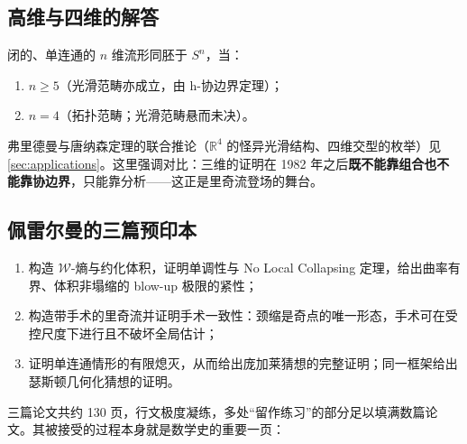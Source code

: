 \subsection{高维与四维的解答}

\begin{theorem}\label{thm:higherdim}
    闭的、单连通的 $n$ 维流形同胚于 $S^n$，当：
    \begin{enumerate}[label=(\arabic*)]
        \item $n \geq 5$（光滑范畴亦成立，由 h-协边界定理）；
        \item $n = 4$（拓扑范畴；光滑范畴悬而未决）。
    \end{enumerate}
\end{theorem}

弗里德曼与唐纳森定理的联合推论（$\mathbb{R}^4$ 的怪异光滑结构、四维交型的枚举）见\cref{sec:applications}。这里强调对比：三维的证明在 1982 年之后\textbf{既不能靠组合也不能靠协边界}，只能靠分析——这正是里奇流登场的舞台。

\subsection{佩雷尔曼的三篇预印本}

\begin{theorem}[佩雷尔曼，2002--2003]\label{thm:perelman}
    \begin{enumerate}[label=(\arabic*)]
        \item \cite{perelman2002entropy} 构造 $\mathcal{W}$-熵与约化体积，证明单调性与 No Local Collapsing 定理，给出曲率有界、体积非塌缩的 blow-up 极限的紧性；
        \item \cite{perelman2003surgery} 构造带手术的里奇流并证明手术一致性：颈缩是奇点的唯一形态，手术可在受控尺度下进行且不破坏全局估计；
        \item \cite{perelman2003extinction} 证明单连通情形的有限熄灭，从而给出庞加莱猜想的完整证明；同一框架给出瑟斯顿几何化猜想的证明。
    \end{enumerate}
\end{theorem}

三篇论文共约 130 页，行文极度凝练，多处“留作练习”的部分足以填满数篇论文。其被接受的过程本身就是数学史的重要一页：

